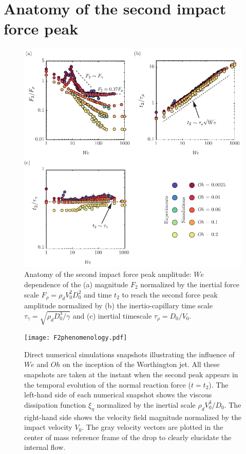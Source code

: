 \documentclass{jfm}
\begin{document}
	\section{Anatomy of the second impact force peak}\label{sec:SecondPeak}
	
	\begin{figure}
		\centering
		\includegraphics[width=\textwidth]{Force2_Anatomy_v4.pdf}
		\caption{Anatomy of the second impact force peak amplitude: $We$ dependence of the (a) magnitude $F_2$ normalized by the inertial force scale $F_\rho = \rho_dV_0^2D_0^2$ and time $t_2$ to reach the second force peak amplitude normalized by (b) the inertio-capillary time scale $\tau_\gamma = \sqrt{\rho_dD_0^3/\gamma}$ and (c) inertial timescale $\tau_\rho = D_0/V_0$.}
		\label{fig:F2Anatomy}
	\end{figure}
	
	\begin{figure}
		\centering
		\texttt{[image: F2phenomenology.pdf]}
		\caption{Direct numerical simulations snapshots illustrating the influence of $We$ and $Oh$ on the inception of the Worthington jet. All these snapshots are taken at the instant when the second peak appears in the temporal evolution of the normal reaction force ($t = t_2$). The left-hand side of each numerical snapshot shows the viscous dissipation function $\xi_\eta$ normalized by the inertial scale $\rho_dV_0^3/D_0$. The right-hand side shows the velocity field magnitude normalized by the impact velocity $V_0$. The gray velocity vectors are plotted in the center of mass reference frame of the drop to clearly elucidate the internal flow.}
		\label{fig:F2Phenomenology}
	\end{figure}
	
\end{document}
